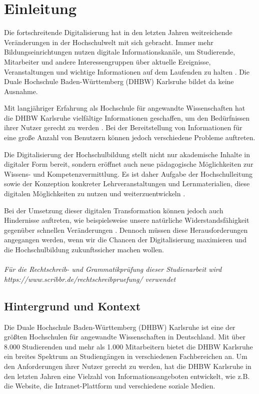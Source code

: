\chapter{Einleitung}
Die fortschreitende Digitalisierung hat in den letzten Jahren weitreichende Veränderungen in der Hochschulwelt mit sich gebracht. Immer mehr Bildungseinrichtungen nutzen digitale Informationskanäle, um Studierende, Mitarbeiter und andere Interessengruppen über aktuelle Ereignisse, Veranstaltungen und wichtige Informationen auf dem Laufenden zu halten \cite{aachenerzeitung2022}. Die Duale Hochschule Baden-Württemberg (DHBW) Karlsruhe bildet da keine Ausnahme.

Mit langjähriger Erfahrung als Hochschule für angewandte Wissenschaften hat die DHBW Karlsruhe vielfältige Informationen geschaffen, um den Bedürfnissen ihrer Nutzer gerecht zu werden \cite{degruyter2021}. Bei der Bereitstellung von Informationen für eine große Anzahl von Benutzern können jedoch verschiedene Probleme auftreten.

Die Digitalisierung der Hochschulbildung stellt nicht nur akademische Inhalte in digitaler Form bereit, sondern eröffnet auch neue pädagogische Möglichkeiten zur Wissens- und Kompetenzvermittlung. \cite{hochschulforumdigitalisierung} Es ist daher Aufgabe der Hochschulleitung sowie der Konzeption konkreter Lehrveranstaltungen und Lernmaterialien, diese digitalen Möglichkeiten zu nutzen und weiterzuentwickeln \cite{springerlink2023}. 

Bei der Umsetzung dieser digitalen Transformation können jedoch auch Hindernisse auftreten, wie beispielsweise unsere natürliche Widerstandsfähigkeit gegenüber schnellen Veränderungen \cite{degruyter2021_2}. Dennoch müssen diese Herausforderungen angegangen werden, wenn wir die Chancen der Digitalisierung maximieren und die Hochschulbildung zukunftssicher machen wollen.
\\\\
\emph{Für die Rechtschreib- und Grammatikprüfung dieser Studienarbeit wird\\ https://www.scribbr.de/rechtschreibpruefung/ verwendet} 

\section{Hintergrund und Kontext}
Die Duale Hochschule Baden-Württemberg (DHBW) Karlsruhe ist eine der größten Hochschulen für angewandte Wissenschaften in Deutschland. Mit über 8.000 Studierenden und mehr als 1.000 Mitarbeitern bietet die DHBW Karlsruhe ein breites Spektrum an Studiengängen in verschiedenen Fachbereichen an. Um den Anforderungen ihrer Nutzer gerecht zu werden, hat die DHBW Karlsruhe in den letzten Jahren eine Vielzahl von Informationsangeboten entwickelt, wie z.B. die Website, die Intranet-Plattform und verschiedene soziale Medien.

